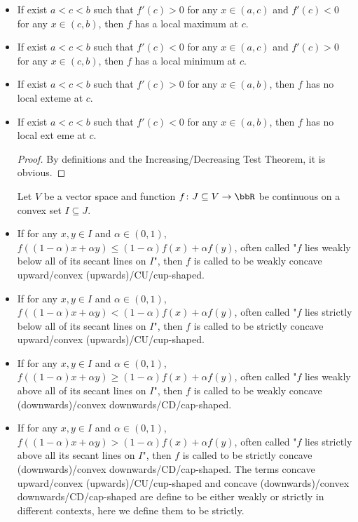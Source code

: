 \documentclass[a4paper,12pt]{report}
\begin{document}
\begin{itemize}
\begin{itemize}
\begin{proof}
    Other statements can be proved similarly.
\end{proof}
Let $f\colon I\subseteq\mathbb{R}\to\mathbb{R}$ be a function, $c$ be a critical point of $f$, and $f$ be continuous on some open interval $J\subseteq I$ with $c\in J$.
\bit
\item If exist $a<c<b$ such that $f'(c)>0$ for any $x\in (a,c)$ and $f'(c)<0$ for any $x\in (c,b)$, then $f$ has a local maximum at $c$.
\item If exist $a<c<b$ such that $f'(c)<0$ for any $x\in (a,c)$ and $f'(c)>0$ for any $x\in (c,b)$, then $f$ has a local minimum at $c$.
\item If exist $a<c<b$ such that $f'(c)>0$ for any $x\in (a,b)$, then $f$ has no local exteme at $c$.
\item If exist $a<c<b$ such that $f'(c)<0$ for any $x\in (a,b)$, then $f$ has no local ext
eme at $c$.
\eit
\begin{proof}
    By definitions and the Increasing/Decreasing Test Theorem, it is obvious.
\end{proof}
Let $V$ be a vector space and function $f\colon J\subseteq V\to\bbR$ be continuous on a convex set $I\subseteq J$.
\bit
\item If for any $x,y\in I$ and $\alpha\in(0,1)$, $f((1-\alpha)x+\alpha y)\leq (1-\alpha)f(x)+\alpha f(y)$, often called "$f$ lies weakly below all of its secant lines on $I$", then $f$ is called to be weakly concave upward/convex (upwards)/CU/cup-shaped.
\item If for any $x,y\in I$ and $\alpha\in(0,1)$, $f((1-\alpha)x+\alpha y)<(1-\alpha)f(x)+\alpha f(y)$, often called "$f$ lies strictly below all of its secant lines on $I$", then $f$ is called to be strictly concave upward/convex (upwards)/CU/cup-shaped.
\item If for any $x,y\in I$ and $\alpha\in(0,1)$, $f((1-\alpha)x+\alpha y)\geq (1-\alpha)f(x)+\alpha f(y)$, often called "$f$ lies weakly above all of its secant lines on $I$", then $f$ is called to be weakly concave (downwards)/convex downwards/CD/cap-shaped.
\item If for any $x,y\in I$ and $\alpha\in(0,1)$, $f((1-\alpha)x+\alpha y)>(1-\alpha)f(x)+\alpha f(y)$, often called "$f$ lies strictly above all its secant lines on $I$", then $f$ is called to be strictly concave (downwards)/convex downwards/CD/cap-shaped.
\eit
The terms concave upward/convex (upwards)/CU/cup-shaped and concave (downwards)/convex downwards/CD/cap-shaped are define to be either weakly or strictly in different contexts, here we define them to be strictly.

\end{itemize}
\end{itemize}
\end{document}
